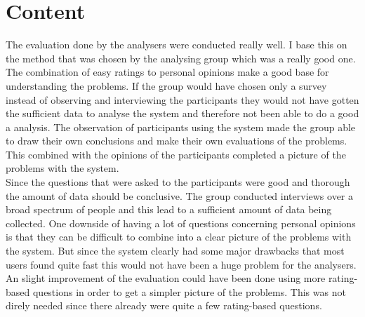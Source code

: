 \documentclass[11pt,a4paper]{article}
\begin{document}
\section{Content}
The evaluation done by the analysers were conducted really well. I base this on the method that was chosen by the analysing group which was a really good one. The combination of easy ratings to personal opinions make a good base for understanding the problems. If the group would have chosen only a survey instead of observing and interviewing the participants they would not have gotten the sufficient data to analyse the system and therefore not been able to do a good a analysis. The observation of participants using the system made the group able to draw their own conclusions and make their own evaluations of the problems. This combined with the opinions of the participants completed a picture of the problems with the system. \\
\newline
Since the questions that were asked to the participants were good and thorough the amount of data should be conclusive. The group conducted interviews over a broad spectrum of people and this lead to a sufficient amount of data being collected. One downside of having a lot of questions concerning personal opinions is that they can be difficult to combine into a clear picture of the problems with the system. But since the system clearly had some major drawbacks that most users found quite fast this would not have been a huge problem for the analysers.\\
	An slight improvement of the evaluation could have been done using more rating-based questions in order to get a simpler picture of the problems. This was not direly needed since there already were quite a few rating-based questions. 
\end{document}
